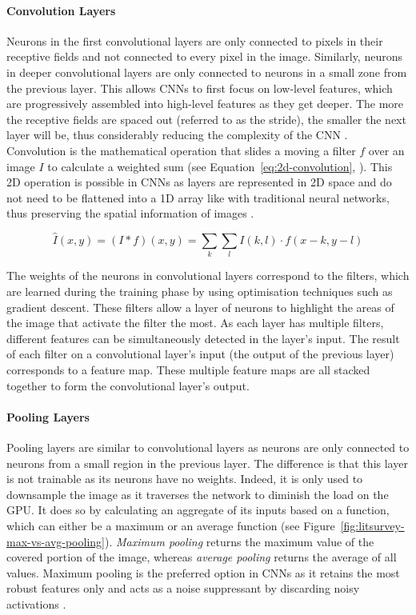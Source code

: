\paragraph{Convolution Layers}

Neurons in the first convolutional layers are only connected to pixels in their receptive fields and not connected to every pixel in the image. Similarly, neurons in deeper convolutional layers are only connected to neurons in a small zone from the previous layer. This allows CNNs to first focus on low-level features, which are progressively assembled into high-level features as they get deeper. The more the receptive fields are spaced out (referred to as the stride), the smaller the next layer will be, thus considerably reducing the complexity of the CNN \citep{Shen2017}. Convolution is the mathematical operation that slides a moving a filter $f$ over an image $I$ to calculate a weighted sum (see Equation~\ref{eq:2d-convolution}, \cite{szeliski2010computer}). This 2D operation is possible in CNNs as layers are represented in 2D space and do not need to be flattened into a 1D array like with traditional neural networks, thus preserving the spatial information of images \citep{szeliski2010computer}.

\begin{equation}
\label{eq:2d-convolution}
    \hat{I}(x,y)=(I*f)(x,y)=\sum_{k}\sum_{l}I(k,l)\cdot f(x-k, y-l)
\end{equation}

The weights of the neurons in convolutional layers correspond to the filters, which are learned during the training phase by using optimisation techniques such as gradient descent. These filters allow a layer of neurons to highlight the areas of the image that activate the filter the most. As each layer has multiple filters, different features can be simultaneously detected in the layer's input. The result of each filter on a convolutional layer's input (the output of the previous layer) corresponds to a feature map. These multiple feature maps are all stacked together to form the convolutional layer's output.

\paragraph{Pooling Layers}

Pooling layers are similar to convolutional layers as neurons are only connected to neurons from a small region in the previous layer. The difference is that this layer is not trainable as its neurons have no weights. Indeed, it is only used to downsample the image as it traverses the network to diminish the load on the GPU. It does so by calculating an aggregate of its inputs based on a function, which can either be a maximum or an average function (see Figure~\ref{fig:litsurvey-max-vs-avg-pooling}). \textit{Maximum pooling} returns the maximum value of the covered portion of the image, whereas \textit{average pooling} returns the average of all values. Maximum pooling is the preferred option in CNNs as it retains the most robust features only and acts as a noise suppressant by discarding noisy activations \citep{Krizhevsky2012}.\\


